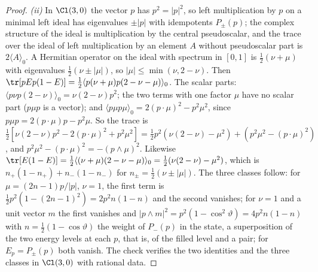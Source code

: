 \begin{proof}
\emph{(ii)} In $\Cl(3,0)$ the vector $p$ has $p^{2} = |p|^{2}$, so left multiplication by $p$ on a minimal left ideal has eigenvalues $\pm|p|$ with idempotents $P_{\pm}(p)$; the complex structure of the ideal is multiplication by the central pseudoscalar, and the trace over the ideal of left multiplication by an element $A$ without pseudoscalar part is $2\langle A\rangle_{0}$. A Hermitian operator on the ideal with spectrum in $[0, 1]$ is $\tfrac12(\nu + \mu)$ with eigenvalues $\tfrac12(\nu \pm |\mu|)$, so $|\mu| \le \min(\nu, 2 - \nu)$. Then $\tr[pEp(1 - E)] = \tfrac12\langle p(\nu + \mu)p(2 - \nu - \mu)\rangle_{0}$. The scalar parts: $\langle p\nu p(2 - \nu)\rangle_{0} = \nu(2 - \nu)p^{2}$; the two terms with one factor $\mu$ have no scalar part ($p\mu p$ is a vector); and $\langle p\mu p\mu\rangle_{0} = 2(p\cdot\mu)^{2} - p^{2}\mu^{2}$, since $p\mu p = 2(p\cdot\mu)p - p^{2}\mu$. So the trace is $\tfrac12[\nu(2 - \nu)p^{2} - 2(p\cdot\mu)^{2} + p^{2}\mu^{2}] = \tfrac12p^{2}(\nu(2 - \nu) - \mu^{2}) + (p^{2}\mu^{2} - (p\cdot\mu)^{2})$, and $p^{2}\mu^{2} - (p\cdot\mu)^{2} = -(p\wedge\mu)^{2}$. Likewise $\tr[E(1 - E)] = \tfrac12\langle(\nu + \mu)(2 - \nu - \mu)\rangle_{0} = \tfrac12(\nu(2 - \nu) - \mu^{2})$, which is $n_{+}(1 - n_{+}) + n_{-}(1 - n_{-})$ for $n_{\pm} = \tfrac12(\nu \pm |\mu|)$. The three classes follow: for $\mu = (2n - 1)p/|p|$, $\nu = 1$, the first term is $\tfrac12p^{2}(1 - (2n - 1)^{2}) = 2p^{2}n(1 - n)$ and the second vanishes; for $\nu = 1$ and a unit vector $m$ the first vanishes and $|p\wedge m|^{2} = p^{2}(1 - \cos^{2}\vartheta) = 4p^{2}n(1 - n)$ with $n = \tfrac12(1 - \cos\vartheta)$ the weight of $P_{-}(p)$ in the state, a superposition of the two energy levels at each $p$, that is, of the filled level and a pair; for $E_{p} = P_{\pm}(p)$ both vanish. The check verifies the two identities and the three classes in $\Cl(3,0)$ with rational data.


\end{proof}
